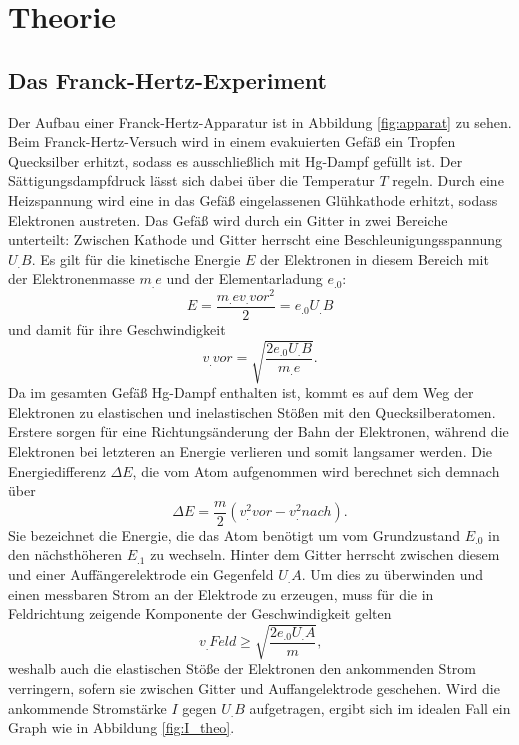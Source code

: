 
\section{Theorie}
\label{sec:Theorie}

\subsection{Das Franck-Hertz-Experiment}
Der Aufbau einer Franck-Hertz-Apparatur ist in Abbildung \ref{fig:apparat} zu sehen.
Beim Franck-Hertz-Versuch wird in einem evakuierten Gefäß ein Tropfen Quecksilber erhitzt, sodass es ausschließlich mit Hg-Dampf gefüllt ist. Der Sättigungsdampfdruck lässt sich dabei über die Temperatur $T$ regeln.
Durch eine Heizspannung wird eine in das Gefäß eingelassenen Glühkathode erhitzt, sodass Elektronen austreten. 
Das Gefäß wird durch ein Gitter in zwei Bereiche unterteilt:
Zwischen Kathode und Gitter herrscht eine Beschleunigungsspannung $U_.B$.
Es gilt für die kinetische Energie $E$ der Elektronen in diesem Bereich mit der Elektronenmasse $m_.e$ und der Elementarladung $e_.0$:
\begin{equation*}
E=\frac{m_.ev_.{vor^2}}{2}=e_.0U_.B
\end{equation*}
und damit für ihre Geschwindigkeit
\begin{equation*}
v_.{vor}=\sqrt{\frac{2e_.0U_.B}{m_.e}}\text{.}
\end{equation*}
Da im gesamten Gefäß Hg-Dampf enthalten ist, kommt es auf dem Weg der Elektronen zu elastischen und inelastischen Stößen mit den Quecksilberatomen. Erstere sorgen für eine Richtungsänderung der Bahn der Elektronen, während die Elektronen bei letzteren an Energie verlieren und somit langsamer werden.
Die Energiedifferenz $\Delta E$, die vom Atom aufgenommen wird berechnet sich demnach über
\[
\Delta E = \frac{m}{2}\left(v^2_.{vor}-v^2_.{nach}\right)\text{.}\label{eq:DeltaE}
\]
Sie bezeichnet die Energie, die das Atom benötigt um vom Grundzustand $E_.0$ in den nächsthöheren $E_.1$ zu wechseln.
Hinter dem Gitter herrscht zwischen diesem und einer Auffängerelektrode ein Gegenfeld $U_.A$.
Um dies zu überwinden und einen messbaren Strom an der Elektrode zu erzeugen, muss für die in Feldrichtung zeigende Komponente der Geschwindigkeit gelten
\[
v_.{Feld}\geq \sqrt{\frac{2e_.0U_.A}{m}}\text{,}
\]
weshalb auch die elastischen Stöße der Elektronen den ankommenden Strom verringern, sofern sie zwischen Gitter und Auffangelektrode geschehen.
Wird die ankommende Stromstärke $I$ gegen $U_.B$ aufgetragen, ergibt sich im idealen Fall ein Graph wie in Abbildung \ref{fig:I_theo}.
